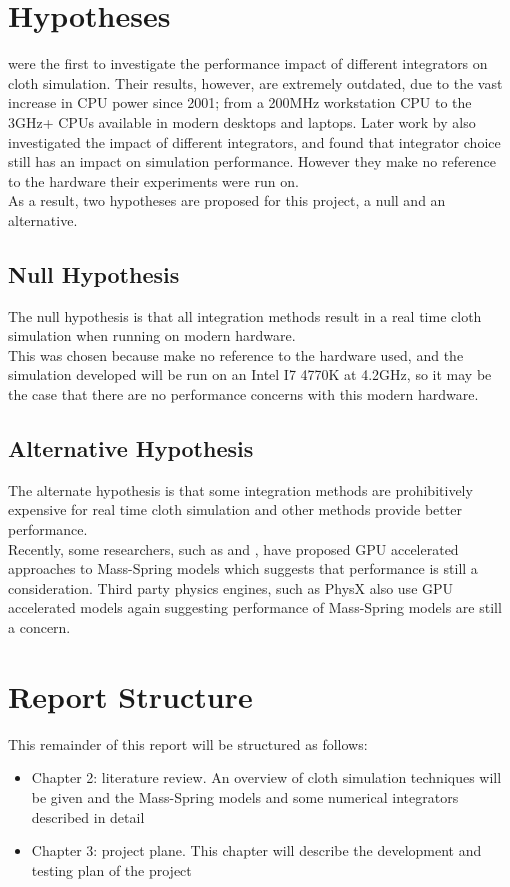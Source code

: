 \section{Hypotheses}
\textcite{Volino2001} were the first to investigate the performance impact of different integrators on cloth simulation. Their results, however, are extremely outdated, due to the vast increase in CPU power since 2001; from a 200MHz workstation CPU to the 3GHz+ CPUs available in modern desktops and laptops. Later work by \textcite{Wang2009a} also investigated the impact of different integrators, and found that integrator choice still has an impact on simulation performance. However they make no reference to the hardware their experiments were run on.
\\As a result, two hypotheses are proposed for this project, a null and an alternative.

\subsection{Null Hypothesis}
The null hypothesis is that all integration methods result in a real time cloth simulation when running on modern hardware.
\\This was chosen because \textcite{Wang2009a} make no reference to the hardware used, and the simulation developed will be run on an Intel I7 4770K at 4.2GHz, so it may be the case that there are no performance concerns with this modern hardware.

\subsection{Alternative Hypothesis}
The alternate hypothesis is that some integration methods are prohibitively expensive for real time cloth simulation and other methods provide better performance.
\\Recently, some researchers, such as \textcite{Zeller2005} and \textcite{Tang2013}, have proposed GPU accelerated approaches to Mass-Spring models which suggests that performance is still a consideration. Third party physics engines, such as PhysX\textsuperscript{\textregistered} also use GPU accelerated models \parencite{Kim2011} again suggesting performance of Mass-Spring models are still a concern.

\section{Report Structure}
This remainder of this report will be structured as follows:
\begin{itemize}
  \item{Chapter 2: literature review. An overview of cloth simulation techniques will be given and the Mass-Spring models and some numerical integrators described in detail}
  \item{Chapter 3: project plane. This chapter will describe the development and testing plan of the project}
\end{itemize}
